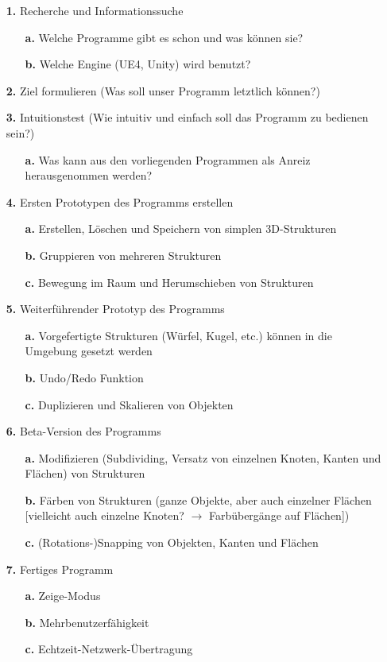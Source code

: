 \documentclass{article}
\begin{document}
\begin{itemize}

\item[\textbf{1.}] Recherche und Informationssuche
\begin{itemize}
\item[\textbf{a.}] Welche Programme gibt es schon und was k\"onnen sie?
\item[\textbf{b.}] Welche Engine (UE4, Unity) wird benutzt?
\end{itemize}

\item[\textbf{2.}] Ziel formulieren (Was soll unser Programm letztlich k\"onnen?)

\item[\textbf{3.}] Intuitionstest (Wie intuitiv und einfach soll das Programm zu bedienen sein?)
\begin{itemize}
\item[\textbf{a.}] Was kann aus den vorliegenden Programmen als Anreiz herausgenommen werden?
\end{itemize}

\item[\textbf{4.}] Ersten Prototypen des Programms erstellen
\begin{itemize}
\item[\textbf{a.}] Erstellen, L\"oschen und Speichern von simplen 3D-Strukturen
\item[\textbf{b.}] Gruppieren von mehreren Strukturen
\item[\textbf{c.}] Bewegung im Raum und Herumschieben von Strukturen
\end{itemize}

\item[\textbf{5.}] Weiterf\"uhrender Prototyp des Programms
\begin{itemize}
\item[\textbf{a.}] Vorgefertigte Strukturen (W\"urfel, Kugel, etc.) k\"onnen in die Umgebung gesetzt werden
\item[\textbf{b.}] Undo/Redo Funktion
\item[\textbf{c.}] Duplizieren und Skalieren von Objekten
\end{itemize}

\item[\textbf{6.}] Beta-Version des Programms
\begin{itemize}
\item[\textbf{a.}] Modifizieren (Subdividing, Versatz von einzelnen Knoten, Kanten und Fl\"achen) von Strukturen
\item[\textbf{b.}] F\"arben von Strukturen (ganze Objekte, aber auch einzelner Fl\"achen [vielleicht auch einzelne Knoten? $\rightarrow$ Farb\"uberg\"ange auf Fl\"achen])
\item[\textbf{c.}] (Rotations-)Snapping von Objekten, Kanten und Fl\"achen
\end{itemize}

\hfill

\item[\textbf{7.}] Fertiges Programm
\begin{itemize}
\item[\textbf{a.}] Zeige-Modus
\item[\textbf{b.}] Mehrbenutzerf\"ahigkeit
\item[\textbf{c.}] Echtzeit-Netzwerk-\"Ubertragung
\end{itemize}

\end{itemize}
\end{document}
